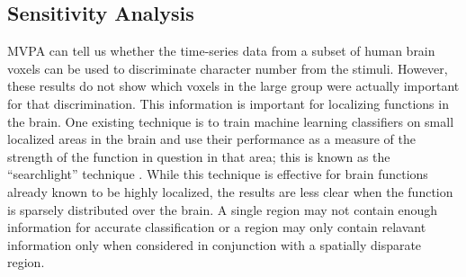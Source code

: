 \documentclass[5p,authoryear]{elsarticle}
\begin{document}
\subsection{Sensitivity Analysis}
MVPA can tell us whether the time-series data from a subset of human brain voxels can be used to discriminate character number from the stimuli. 
However, these results do not show which voxels in the large group were actually important for that discrimination.
This information is important for localizing functions in the brain.
One existing technique is to train machine learning classifiers on small localized areas in the brain and use their performance as a measure of the strength of the function in question in that area; this is known as the ``searchlight'' technique \citep{Kriegeskorte2006}.
While this technique is effective for brain functions already known to be highly localized, the results are less clear when the function is sparsely distributed over the brain.
A single region may not contain enough information for accurate classification or a region may only contain relavant information only when considered in conjunction with a spatially disparate region.

\end{document}
